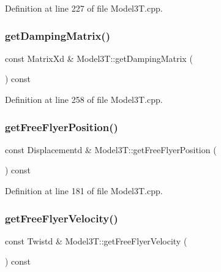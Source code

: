 Definition at line 227 of file Model3\+T.\+cpp.

\hypertarget{classModel3T_a5ed6794462c63bdd1eeabbfa221e2ef6}{}\label{classModel3T_a5ed6794462c63bdd1eeabbfa221e2ef6} 
\subsubsection{\texorpdfstring{get\+Damping\+Matrix()}{getDampingMatrix()}}
{\footnotesize\ttfamily const Matrix\+Xd \& Model3\+T\+::get\+Damping\+Matrix (\begin{DoxyParamCaption}{ }\end{DoxyParamCaption}) const\hspace{0.3cm}{\ttfamily [virtual]}}



Definition at line 258 of file Model3\+T.\+cpp.

\hypertarget{classModel3T_ab9a2a5644b40341af54e408dd8d1b0de}{}\label{classModel3T_ab9a2a5644b40341af54e408dd8d1b0de} 
\subsubsection{\texorpdfstring{get\+Free\+Flyer\+Position()}{getFreeFlyerPosition()}}
{\footnotesize\ttfamily const Displacementd \& Model3\+T\+::get\+Free\+Flyer\+Position (\begin{DoxyParamCaption}{ }\end{DoxyParamCaption}) const\hspace{0.3cm}{\ttfamily [virtual]}}



Definition at line 181 of file Model3\+T.\+cpp.

\hypertarget{classModel3T_aa2b2a35af047f4fd539131e87ee3af2a}{}\label{classModel3T_aa2b2a35af047f4fd539131e87ee3af2a} 
\subsubsection{\texorpdfstring{get\+Free\+Flyer\+Velocity()}{getFreeFlyerVelocity()}}
{\footnotesize\ttfamily const Twistd \& Model3\+T\+::get\+Free\+Flyer\+Velocity (\begin{DoxyParamCaption}{ }\end{DoxyParamCaption}) const\hspace{0.3cm}{\ttfamily [virtual]}}



